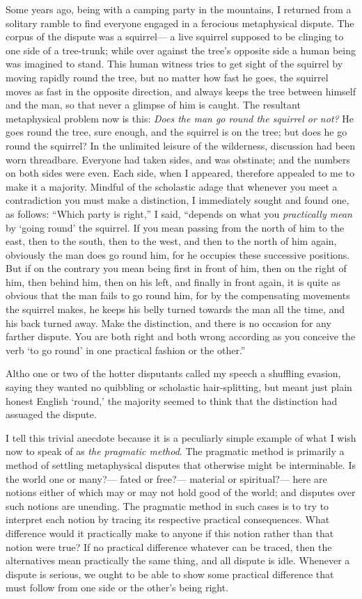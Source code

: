 \documentclass[]{article}
\begin{document}
Some years ago, being with a camping party in the mountains, I
returned from a solitary ramble to find everyone engaged in a ferocious
metaphysical dispute. The corpus of the dispute was a squirrel--- a live
squirrel supposed to be clinging to one side of a tree-trunk; while over
against the tree's opposite side a human being was imagined to stand.
This human witness tries to get sight of the squirrel by moving rapidly
round the tree, but no matter how fast he goes, the squirrel moves
as fast in the opposite direction, and always keeps the tree between
himself and the man, so that never a glimpse of him is caught. The
resultant metaphysical problem now is this: \emph{Does the man go round the
squirrel or not?} He goes round the tree, sure enough, and the squirrel
is on the tree; but does he go round the squirrel? In the unlimited
leisure of the wilderness, discussion had been worn threadbare. Everyone
had taken sides, and was obstinate; and the numbers on both sides were
even. Each side, when I appeared, therefore appealed to me to make it
a majority. Mindful of the scholastic adage that whenever you meet a
contradiction you must make a distinction, I immediately sought and
found one, as follows: ``Which party is right,'' I said, ``depends on what
you \emph{practically mean} by `going round' the squirrel. If you mean passing
from the north of him to the east, then to the south, then to the west,
and then to the north of him again, obviously the man does go round him,
for he occupies these successive positions. But if on the contrary you
mean being first in front of him, then on the right of him, then behind
him, then on his left, and finally in front again, it is quite as
obvious that the man fails to go round him, for by the compensating
movements the squirrel makes, he keeps his belly turned towards the man
all the time, and his back turned away. Make the distinction, and there
is no occasion for any farther dispute. You are both right and both
wrong according as you conceive the verb `to go round' in one practical
fashion or the other.''

Altho one or two of the hotter disputants called my speech a shuffling
evasion, saying they wanted no quibbling or scholastic hair-splitting,
but meant just plain honest English `round,' the majority seemed to
think that the distinction had assuaged the dispute.

I tell this trivial anecdote because it is a peculiarly simple example
of what I wish now to speak of as \emph{the pragmatic method}. The pragmatic
method is primarily a method of settling metaphysical disputes that
otherwise might be interminable. Is the world one or many?--- fated or
free?--- material or spiritual?--- here are notions either of which may
or may not hold good of the world; and disputes over such notions are
unending. The pragmatic method in such cases is to try to interpret each
notion by tracing its respective practical consequences. What difference
would it practically make to anyone if this notion rather than that
notion were true? If no practical difference whatever can be traced,
then the alternatives mean practically the same thing, and all dispute
is idle. Whenever a dispute is serious, we ought to be able to show some
practical difference that must follow from one side or the other's being
right.
\end{document}
